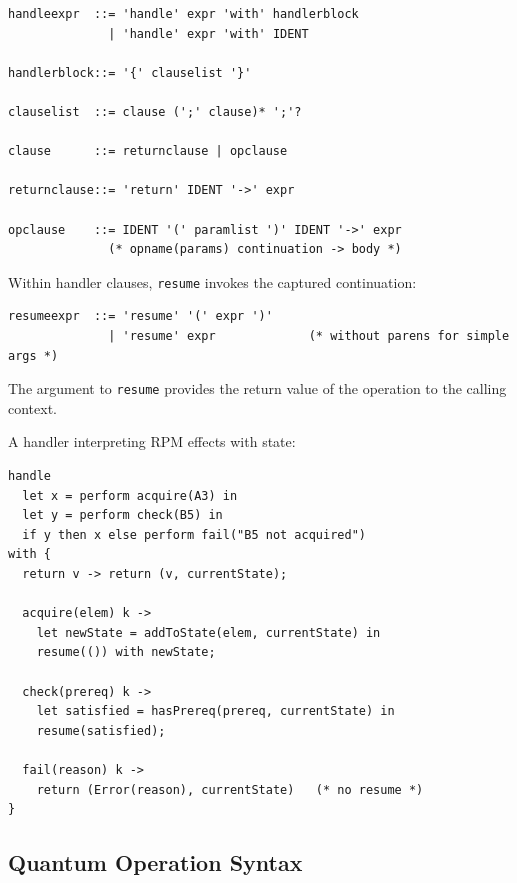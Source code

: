 \begin{definition}
\label{def:handler-expr-grammar}
\begin{lstlisting}[style=bnf,caption={Handler Expression Grammar}]
handleexpr  ::= 'handle' expr 'with' handlerblock
              | 'handle' expr 'with' IDENT

handlerblock::= '{' clauselist '}'

clauselist  ::= clause (';' clause)* ';'?

clause      ::= returnclause | opclause

returnclause::= 'return' IDENT '->' expr

opclause    ::= IDENT '(' paramlist ')' IDENT '->' expr
              (* opname(params) continuation -> body *)
\end{lstlisting}
\end{definition}

\begin{definition}
\label{def:resume-syntax}
Within handler clauses, \texttt{resume} invokes the captured continuation:
\begin{lstlisting}[style=bnf,caption={Resume Syntax}]
resumeexpr  ::= 'resume' '(' expr ')'
              | 'resume' expr             (* without parens for simple args *)
\end{lstlisting}
The argument to \texttt{resume} provides the return value of the operation to the calling context.
\end{definition}

\begin{example}
\label{ex:rpm-handler}
A handler interpreting RPM effects with state:
\begin{verbatim}
handle
  let x = perform acquire(A3) in
  let y = perform check(B5) in
  if y then x else perform fail("B5 not acquired")
with {
  return v -> return (v, currentState);

  acquire(elem) k ->
    let newState = addToState(elem, currentState) in
    resume(()) with newState;

  check(prereq) k ->
    let satisfied = hasPrereq(prereq, currentState) in
    resume(satisfied);

  fail(reason) k ->
    return (Error(reason), currentState)   (* no resume *)
}
\end{verbatim}
\end{example}

\subsection{Quantum Operation Syntax}
\label{subsec:quantum-syntax}

